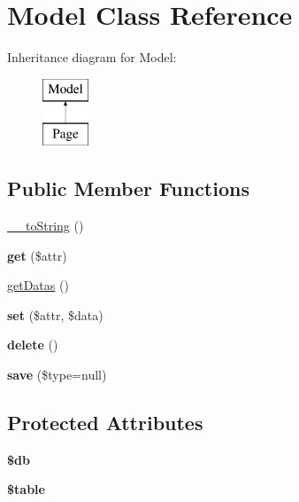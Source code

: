 \hypertarget{classModel}{}\section{Model Class Reference}
\label{classModel}
Inheritance diagram for Model\+:\begin{figure}[H]
\begin{center}
\leavevmode
\includegraphics[height=2.000000cm]{classModel}
\end{center}
\end{figure}
\subsection*{Public Member Functions}
\begin{DoxyCompactItemize}
\item 
\hyperlink{classModel_a382fdbffcf380bd37ccde3d26df12c06}{\+\_\+\+\_\+to\+String} ()
\item 
{\bfseries get} (\$attr)\hypertarget{classModel_a45ccb8b015e3303207121177bf706343}{}\label{classModel_a45ccb8b015e3303207121177bf706343}

\item 
\hyperlink{classModel_a94c7c4d7a3a1760273b5d454f0c1dc45}{get\+Datas} ()
\item 
{\bfseries set} (\$attr, \$data)\hypertarget{classModel_a038fd483841494da31bda89eeb6e8e36}{}\label{classModel_a038fd483841494da31bda89eeb6e8e36}

\item 
{\bfseries delete} ()\hypertarget{classModel_af55cc78d20b12b64bb6f584496a60a52}{}\label{classModel_af55cc78d20b12b64bb6f584496a60a52}

\item 
{\bfseries save} (\$type=null)\hypertarget{classModel_a348647bb10068f9fd036fa8ffdc2042a}{}\label{classModel_a348647bb10068f9fd036fa8ffdc2042a}

\end{DoxyCompactItemize}
\subsection*{Protected Attributes}
\begin{DoxyCompactItemize}
\item 
{\bfseries \$db}\hypertarget{classModel_a348093562fd01bcc977cc6659cf7b48f}{}\label{classModel_a348093562fd01bcc977cc6659cf7b48f}

\item 
{\bfseries \$table}\hypertarget{classModel_a4fb4dfe4b3f9cc152727e59c3d666d19}{}\label{classModel_a4fb4dfe4b3f9cc152727e59c3d666d19}

\end{DoxyCompactItemize}


